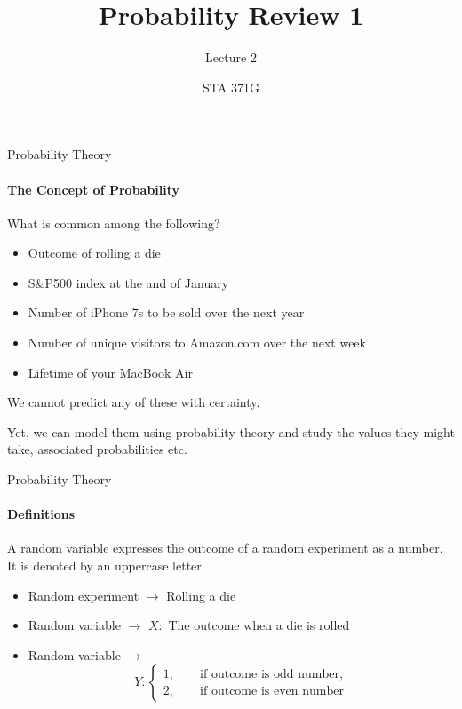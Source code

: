 \documentclass{beamer}\usepackage[]{graphicx}\usepackage[]{color}
\title{Probability Review 1}
\subtitle{Lecture 2}
\author{STA 371G}
\begin{document}
  
  

  \frame{\maketitle}



   \begin{darkframes}
  

    \begin{frame}[label=lists]{Probability Theory}
      \framesubtitle{The Concept of Probability}
      
      What is common among the following?
      
      \begin{itemize}
      	\item Outcome of rolling a die
      	\item S\&P500 index at the and of January
      	\item Number of iPhone 7s to be sold over the next year
      	\item Number of unique visitors to Amazon.com over the next week
      	\item Lifetime of your MacBook Air
      \end{itemize}
      
      We cannot predict any of these with certainty. 
      
      Yet, we can model them using \alert{probability theory} and study the values they might take, associated probabilities etc.
      
     \end{frame}    


    \begin{frame}[label=lists]{Probability Theory}
		\framesubtitle{Definitions}    
		\begin{definition}
       		A \alert{random variable} expresses the outcome of a \alert{random experiment} as a number. It is denoted by an uppercase letter.
      	\end{definition} 	
      	
      		\begin{itemize}
      			\item Random experiment $\rightarrow$ Rolling a die
      			\item Random variable $\rightarrow$ $X:$ The outcome when a die is rolled
				\item Random variable $\rightarrow$ $$ Y : \begin{cases}
        					1, \qquad \text{if outcome is odd number,}  \\
        					2, \qquad \text{if outcome is even number}  
        		            \end{cases}
        		      $$ 
        	\end{itemize}	
	

\end{frame}
\end{darkframes}
\end{document}
